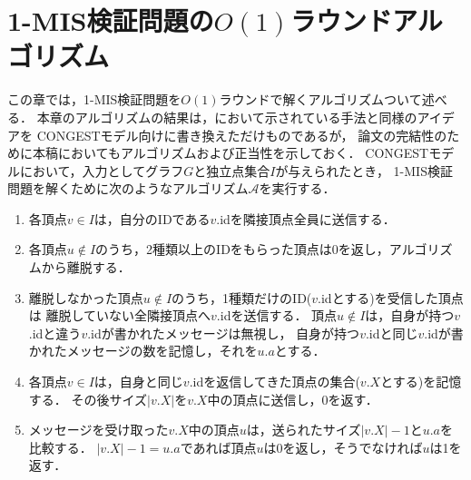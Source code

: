 \documentclass[12pt]{thesis}
\newcommand{\CONGEST}{\textsf{CONGEST}}
\theoremstyle{definition}
\begin{document}
\chapter{1-MIS検証問題の$O(1)$ラウンドアルゴリズム}
この章では，1-MIS検証問題を$O(1)$ラウンドで解くアルゴリズムついて述べる．
本章のアルゴリズムの結果は，\cite{tanaka2019self}において示されている手法と同様のアイデアを
{\CONGEST}モデル向けに書き換えただけものであるが，
論文の完結性のために本稿においてもアルゴリズムおよび正当性を示しておく．
{\CONGEST}モデルにおいて，入力としてグラフ$G$と独立点集合$I$が与えられたとき，
1-MIS検証問題を解くために次のようなアルゴリズム$\mathcal{A}$を実行する．
\begin{enumerate}
\item 各頂点$v \in I$は，自分のIDである$v$.idを隣接頂点全員に送信する．
\item 各頂点$u \notin I$のうち，2種類以上のIDをもらった頂点は0を返し，アルゴリズムから離脱する．
\item 離脱しなかった頂点$u \notin I$のうち，1種類だけのID($v$.idとする)を受信した頂点は
離脱していない全隣接頂点へ$v$.idを送信する．
頂点$u \notin I$は，自身が持つ$v$.idと違う$v$.idが書かれたメッセージは無視し，
自身が持つ$v$.idと同じ$v$.idが書かれたメッセージの数を記憶し，それを$u.a$とする．
\item 各頂点$v \in I$は，自身と同じ$v$.idを返信してきた頂点の集合($v.X$とする)を記憶する．
その後サイズ$|v.X|$を$v.X$中の頂点に送信し，0を返す．
\item メッセージを受け取った$v.X$中の頂点$u$は，送られたサイズ$|v.X| - 1$と$u.a$を比較する．
$|v.X | - 1 = u.a$であれば頂点$u$は$0$を返し，そうでなければ$u$は1を返す．
\end{enumerate}
\end{document}
